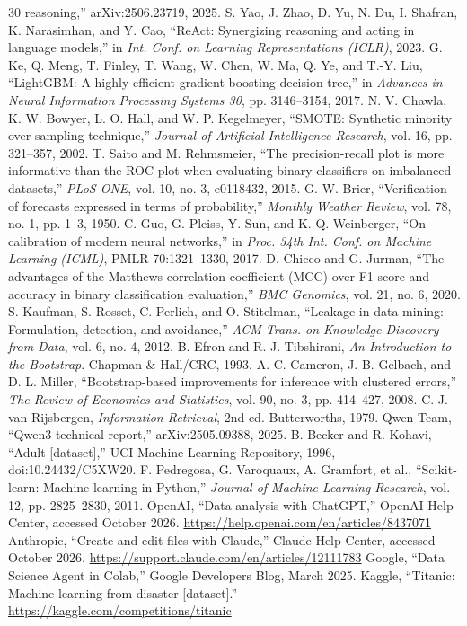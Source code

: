 \documentclass[10pt,twocolumn]{article}
\begin{document}
\begin{thebibliography}{30}
  reasoning,'' arXiv:2506.23719, 2025.
 S. Yao, J. Zhao, D. Yu, N. Du, I. Shafran, K. Narasimhan, and Y. Cao, ``ReAct: Synergizing reasoning
  and acting in language models,'' in \emph{Int. Conf. on Learning Representations (ICLR)}, 2023.
 G. Ke, Q. Meng, T. Finley, T. Wang, W. Chen, W. Ma, Q. Ye, and T.-Y. Liu, ``LightGBM: A highly
  efficient gradient boosting decision tree,'' in \emph{Advances in Neural Information Processing Systems 30}, pp.
  3146--3154, 2017.
 N. V. Chawla, K. W. Bowyer, L. O. Hall, and W. P. Kegelmeyer, ``SMOTE: Synthetic minority
  over-sampling technique,'' \emph{Journal of Artificial Intelligence Research}, vol. 16, pp. 321--357, 2002.
 T. Saito and M. Rehmsmeier, ``The precision-recall plot is more informative than the ROC plot when
  evaluating binary classifiers on imbalanced datasets,'' \emph{PLoS ONE}, vol. 10, no. 3, e0118432, 2015.
 G. W. Brier, ``Verification of forecasts expressed in terms of probability,'' \emph{Monthly Weather
  Review}, vol. 78, no. 1, pp. 1--3, 1950.
 C. Guo, G. Pleiss, Y. Sun, and K. Q. Weinberger, ``On calibration of modern neural networks,'' in
  \emph{Proc. 34th Int. Conf. on Machine Learning (ICML)}, PMLR 70:1321--1330, 2017.
 D. Chicco and G. Jurman, ``The advantages of the Matthews correlation coefficient (MCC) over F1
  score and accuracy in binary classification evaluation,'' \emph{BMC Genomics}, vol. 21, no. 6, 2020.
 S. Kaufman, S. Rosset, C. Perlich, and O. Stitelman, ``Leakage in data mining: Formulation,
  detection, and avoidance,'' \emph{ACM Trans. on Knowledge Discovery from Data}, vol. 6, no. 4, 2012.
 B. Efron and R. J. Tibshirani, \emph{An Introduction to the Bootstrap}. Chapman \& Hall/CRC, 1993.
 A. C. Cameron, J. B. Gelbach, and D. L. Miller, ``Bootstrap-based improvements for inference with
  clustered errors,'' \emph{The Review of Economics and Statistics}, vol. 90, no. 3, pp. 414--427, 2008.
 C. J. van Rijsbergen, \emph{Information Retrieval}, 2nd ed. Butterworths, 1979.
 Qwen Team, ``Qwen3 technical report,'' arXiv:2505.09388, 2025.
 B. Becker and R. Kohavi, ``Adult [dataset],'' UCI Machine Learning Repository, 1996,
  doi:10.24432/C5XW20.
 F. Pedregosa, G. Varoquaux, A. Gramfort, et al., ``Scikit-learn: Machine learning in Python,''
  \emph{Journal of Machine Learning Research}, vol. 12, pp. 2825--2830, 2011.
 OpenAI, ``Data analysis with ChatGPT,'' OpenAI Help Center, accessed October 2026.
  \url{https://help.openai.com/en/articles/8437071}
 Anthropic, ``Create and edit files with Claude,'' Claude Help Center, accessed October 2026.
  \url{https://support.claude.com/en/articles/12111783}
 Google, ``Data Science Agent in Colab,'' Google Developers Blog, March 2025.
 Kaggle, ``Titanic: Machine learning from disaster [dataset].''
  \url{https://kaggle.com/competitions/titanic}
\end{thebibliography}
\endgroup
\end{document}
